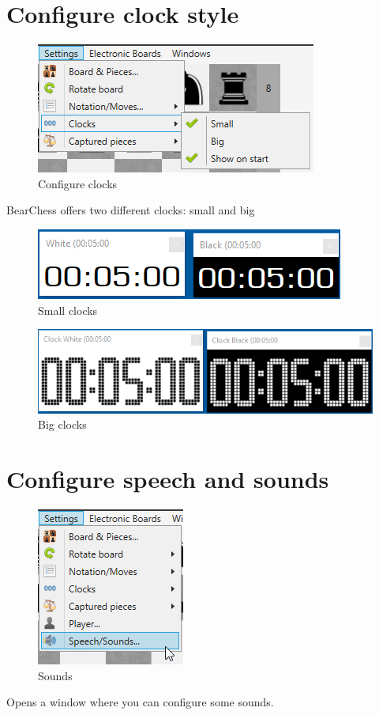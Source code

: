 \documentclass[11pt,a4paper]{article}
\begin{document}
\section{Configure clock style}
\begin{figure}[H]
	\centering
	\includegraphics[scale=1.0]{ConfigureClocks.png}
	\caption{Configure clocks }
	\label{fig:ConfigureClocks}
\end{figure}

BearChess offers two different clocks: small and big

\begin{figure}[H]
	\centering
	\includegraphics[scale=1.0]{SmallClocks.png}
	\caption{Small clocks }
	\label{fig:SmallClocks}
\end{figure}
\begin{figure}[H]
	\centering
	\includegraphics[scale=0.8]{BigClocks.png}
	\caption{Big clocks }
	\label{fig:BigClocks}
\end{figure}

\section{Configure speech and sounds}

\begin{figure}[H]
	\centering
	\includegraphics[scale=1.0]{Sounds2.png}
	\caption{Sounds }
	\label{fig:Sounds2}
\end{figure}
Opens a window where you can configure some sounds.
\end{document}

